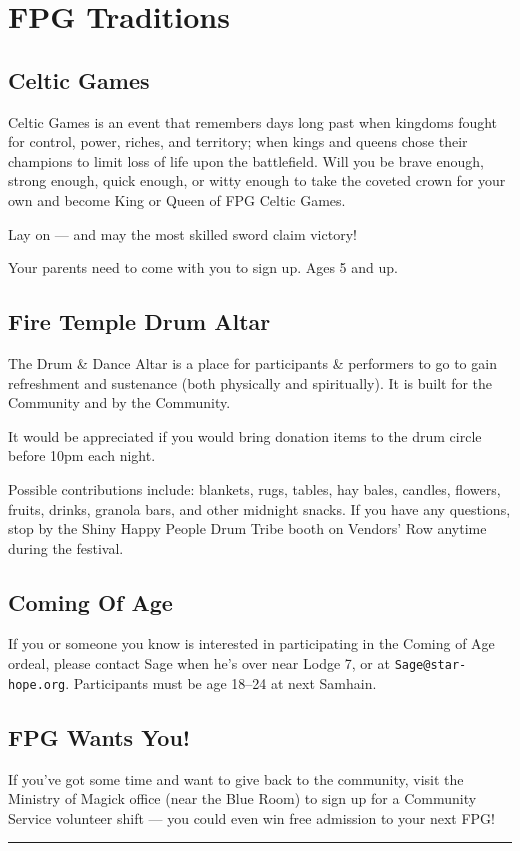\documentclass[9pt,twoside,openright,final,article,letterpaper]{memoir}
\renewcommand{\pfbreakdisplay}{%
  \needspace{24pt}%
  \vspace{8pt}\\\ding{76}\quad\ding{77}\quad\ding{78}\\%
  \vspace{11pt}}
\let\oldsection=\section
\renewcommand{\section}[1]{%
  \nopagebreak
  \vspace{6pt} %
  \needspace{1.5in}
  \oldsection{#1}
  \nopagebreak}
\let\oldsubsection=\subsection
\renewcommand{\subsection}[1]{%
  \vspace{6pt}
  \needspace{1.25in}
  \oldsubsection{#1}
  \nopagebreak}
\begin{document}
\section{FPG Traditions}
\begin{multicols}{3}

  \subsection{Celtic Games}

  Celtic Games is an event that remembers days long past when kingdoms
  fought for control, power, riches, and territory; when kings and
  queens chose their champions to limit loss of life upon the
  battlefield. Will you be brave enough, strong enough, quick enough,
  or witty enough to take the coveted crown for your own and become
  King or Queen of FPG Celtic Games. 

  Lay on --- and may the most skilled sword claim victory!

  Your parents need to come with you to sign up. Ages 5 and up.

  \subsection{Fire Temple Drum Altar}

  The Drum \& Dance Altar is a place for participants \& performers to
  go to gain refreshment and sustenance (both physically and
  spiritually). It is built for the Community and by the Community.
  
  It would be appreciated if you would bring donation items to the
  drum circle before 10pm each night.

  Possible contributions include: blankets, rugs, tables, hay bales,
  candles, flowers, fruits, drinks, granola bars, and other midnight
  snacks. If you have any questions, stop by the Shiny Happy People Drum
  Tribe booth on Vendors’ Row anytime during the festival.


  \subsection{Coming Of Age}

  If you or someone you know is interested in participating in the
  Coming of Age ordeal, please contact Sage when he's over near Lodge 7,
  or at \texttt{Sage@star-hope.org}. Participants must be age 18--24 at
  next Samhain.

  \subsection{FPG Wants You!}

  If you've got some time and want to give back to the community, visit
  the Ministry of Magick office (near the Blue Room) to sign up for a
  Community Service volunteer shift --- you could even win free
  admission to your next FPG!

  \fancybreak{\pfbreakdisplay}

\end{multicols}
\end{document}
